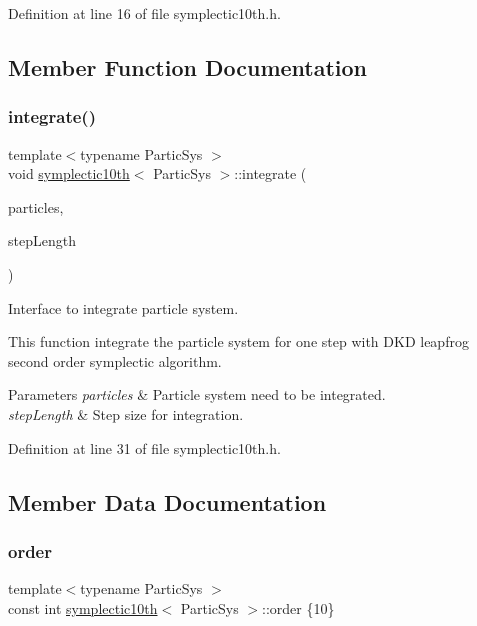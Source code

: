 Definition at line 16 of file symplectic10th.\+h.



\subsection{Member Function Documentation}
\mbox{\label{classsymplectic10th_aaa762c854968f135a0a6b01c908c7636}} 
\subsubsection{\texorpdfstring{integrate()}{integrate()}}
{\footnotesize\ttfamily template$<$typename Partic\+Sys $>$ \\
void \mbox{\hyperlink{classsymplectic10th}{symplectic10th}}$<$ Partic\+Sys $>$\+::integrate (\begin{DoxyParamCaption}\item[{Partic\+Sys \&}]{particles,  }\item[{\mbox{\hyperlink{classsymplectic10th_a700bbf7a6116e27ac7c6bfd0cc3018bc}{Scalar}}}]{step\+Length }\end{DoxyParamCaption})}



Interface to integrate particle system. 

This function integrate the particle system for one step with D\+KD leapfrog second order symplectic algorithm. 
\begin{DoxyParams}{Parameters}
{\em particles} & Particle system need to be integrated. \\
\hline
{\em step\+Length} & Step size for integration. \\
\hline
\end{DoxyParams}


Definition at line 31 of file symplectic10th.\+h.



\subsection{Member Data Documentation}
\mbox{\label{classsymplectic10th_af1cb88e94e3022b5bf90091d03c609a4}} 
\subsubsection{\texorpdfstring{order}{order}}
{\footnotesize\ttfamily template$<$typename Partic\+Sys $>$ \\
const int \mbox{\hyperlink{classsymplectic10th}{symplectic10th}}$<$ Partic\+Sys $>$\+::order \{10\}\hspace{0.3cm}{\ttfamily [static]}}



